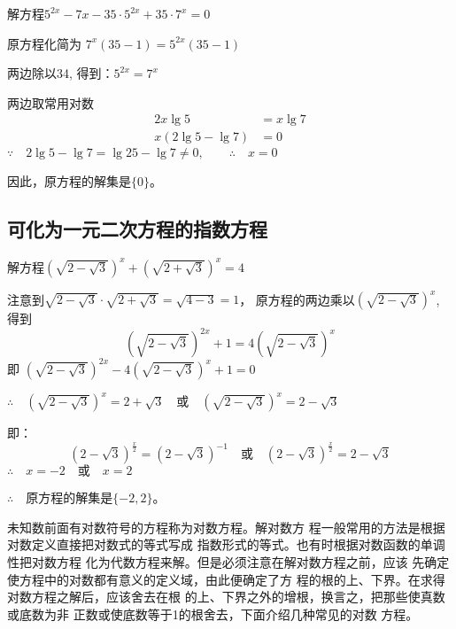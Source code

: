 \begin{example}
  解方程$5^{2x}-7x-35\cdot 5^{2x}+35\cdot 7^x=0$
\end{example}

\begin{solution}
    原方程化简为
  $7^x (35-1)=5^{2x}(35-1)$

  两边除以34, 得到：$5^{2x}=7^x$

  两边取常用对数
  \[\begin{split}
    2x\lg5&=x\lg7\\
  x(2\lg5-\lg7)&=0
  \end{split} \]
$\because\quad   2\lg5-\lg7=\lg25-\lg7\ne 0,\qquad \therefore\quad x=0$

  因此，原方程的解集是$\{0\}$。
\end{solution}

\subsection{可化为一元二次方程的指数方程}

\begin{example}
    解方程$\left(\sqrt{2-\sqrt{3}}\right)^x+\left(\sqrt{2+\sqrt{3}}\right)^x=4$
\end{example}

\begin{solution}
    注意到$\sqrt{2-\sqrt{3}}\cdot \sqrt{2+\sqrt{3}}=\sqrt{4-3}=1$，
原方程的两边乘以$\left(\sqrt{2-\sqrt{3}}\right)^x$, 得到
\[\left(\sqrt{2-\sqrt{3}}\right)^{2x}+1=4\left(\sqrt{2-\sqrt{3}}\right)^x\]
即
$\left(\sqrt{2-\sqrt{3}}\right)^{2x}-4\left(\sqrt{2-\sqrt{3}}\right)^x+1=0$

$\therefore\quad \left(\sqrt{2-\sqrt{3}}\right)^x=2+\sqrt{3}\quad \text{或}\quad \left(\sqrt{2-\sqrt{3}}\right)^x=2-\sqrt{3}$

即：
\[\left({2-\sqrt{3}}\right)^{\tfrac{x}{2}}=\left({2-\sqrt{3}}\right)^{-1}\quad \text{或}\quad \left({2-\sqrt{3}}\right)^{\tfrac{x}{2}}=2-\sqrt{3}\]
$\therefore\quad x=-2\quad \text{或}\quad x=2$

$\therefore\quad $原方程的解集是$\{-2,2\}$。
\end{solution}

未知数前面有对数符号的方程称为对数方程。解对数方
程一般常用的方法是根据对数定义直接把对数式的等式写成
指数形式的等式。也有时根据对数函数的单调性把对数方程
化为代数方程来解。但是必须注意在解对数方程之前，应该
先确定使方程中的对数都有意义的定义域，由此便确定了方
程的根的上、下界。在求得对数方程之解后，应该舍去在根
的上、下界之外的增根，换言之，把那些使真数或底数为非
正数或使底数等于1的根舍去，下面介绍几种常见的对数
方程。

